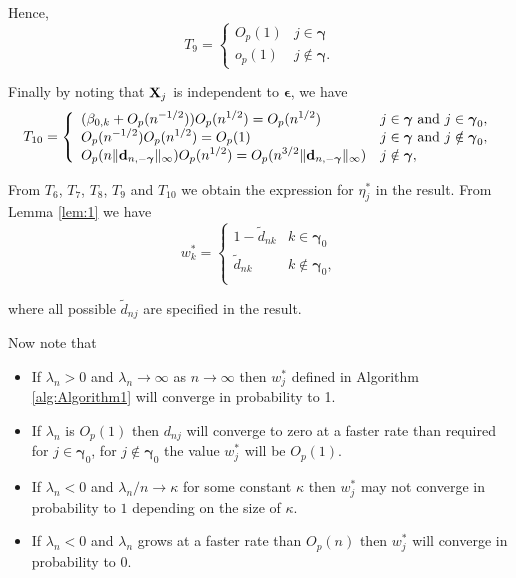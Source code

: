 \documentclass[11pt]{article}
\newtheorem{Main Result}{Main Result}
\def\vectorfontone{\bf}
\def\vectorfonttwo{\boldsymbol}
\def\vd{{\vectorfontone d}}                      %
\def\vgamma{{\vectorfonttwo \gamma}}             %
\def\vepsilon{{\vectorfonttwo \epsilon}}         %
\def\vX{{\vectorfontone X}}                      %
\def\ds{\displaystyle}
\begin{document}
{\noindent Hence,
$$
T_9 \ds =
\left\{ \begin{array}{ll}
O_p(1)
& j\in\vgamma \\
o_p(1)
& j\notin\vgamma.
\end{array} \right.
$$

\noindent Finally by noting that $\vX_j$ is independent to $\vepsilon$, we have
$$
T_{10} =\left\{ \begin{array}{ll}
\ds    (\beta_{0,k} + O_p(n^{-1/2}))O_p(n^{1/2})= O_p(n^{1/2})
&  \mbox{$j\in \vgamma$ and $j\in\vgamma_0$},\\ %
\ds    O_p(n^{-1/2})O_p(n^{1/2})= O_p(1)
&  \mbox{$j\in \vgamma$ and $j\notin\vgamma_0$}, \\ %
\ds    O_p(n\|\vd_{n,-\vgamma}\|_\infty)O_p(n^{1/2})=O_p(n^{3/2}\|\vd_{n,-\vgamma}\|_\infty)
&  \mbox{$j\notin \vgamma$},
\end{array} \right.
$$


\noindent From $T_6$, $T_7$, $T_8$, $T_9$ and $T_{10}$ 
we obtain the expression for $\eta_j^*$ in the result.
From Lemma \ref{lem:1} we have
$$
w_k^{*} = \left\{ \begin{array}{ll}
1 - \widetilde{d}_{nk}   & \mbox{$k\in\vgamma_0$} \\
\widetilde{d}_{nk}     & \mbox{$k\notin\vgamma_0$}, \\
\end{array} \right.
$$

\noindent where all possible
$\widetilde{d}_{nj}$ are specified in the result.



\noindent Now note that
\begin{itemize}
	\item If $\lambda_n>0$ and $\lambda_n\to\infty$
	as $n\to\infty$ then $w_j^*$ defined in Algorithm \ref{alg:Algorithm1} will converge in probability to 1.
	
	\item If $\lambda_n$ is $O_p(1)$ then $d_{nj}$ will converge
	to zero at a faster rate than required for $j\in\vgamma_0$,
	for $j\notin\vgamma_0$ the value $w_j^*$ will be $O_p(1)$.
	
	\item If $\lambda_n<0$ and $\lambda_n/n\to \kappa$
	for some constant $\kappa$ then $w_j^*$ may not converge in probability to $1$ depending on the size of $\kappa$.
	
	\item If $\lambda_n<0$ and $\lambda_n$ grows at
	a faster rate than $O_p(n)$ then $w_j^*$ will converge in probability
	to $0$.
	

\end{itemize}}
\end{document}
